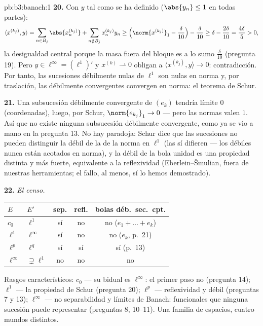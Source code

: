 \begin{solution}{pb:b3:banach:1}
\textbf{20.} Con $y$ tal como se ha definido ($\abs{y_n} \leq 1$ en
todas partes):
\[
\langle x^{(k_j)}, y\rangle
= \sum_{n \in B_j}\abs{x^{(k_j)}_n}
+ \sum_{n \notin B_j}x^{(k_j)}_ny_n
\geq \Bigl(\norm{x^{(k_j)}}_1 - \frac\delta{10}\Bigr) -
\frac\delta{10}
\geq \delta - \frac{2\delta}{10} = \frac{4\delta}5 > 0,
\]
la desigualdad central porque la masa fuera del bloque es a lo sumo
$\frac\delta{10}$ (pregunta 19). Pero $y \in
\ell^\infty = (\ell^1)'$ y $x^{(k)} \rightharpoonup 0$ obligan a
$\langle x^{(k_j)}, y\rangle \to 0$: contradicción. Por tanto, las
sucesiones débilmente nulas de $\ell^1$ son nulas en norma y, por
traslación, las débilmente convergentes convergen en norma: el teorema
de Schur.

\textbf{21.} Una subsucesión débilmente convergente de $(e_k)$ tendría
límite $0$ (coordenadas), luego, por Schur, $\norm{e_{k_j}}_1
\to 0$ --- pero las normas valen $1$. Así que no existe ninguna
subsucesión débilmente convergente, como ya se vio a mano en la pregunta
13. No hay paradoja: Schur dice que las sucesiones no pueden distinguir
la  débil de la de la norma
en $\ell^1$ (las  sí difieren --- los
 débiles nunca están acotados
en norma), y la  débil de la bola unidad es una propiedad distinta y más
fuerte, equivalente a la reflexividad (Eberlein--Šmulian, fuera de
nuestras herramientas; el fallo, al menos, sí lo hemos demostrado).

\textbf{22.} \emph{El censo.}
\begin{center}
\begin{tabular}{l|l|c|c|c}
$E$ & $E'$ & sep. & refl. & bolas déb.\ sec.\ cpt.\\
\hline
$c_0$ & $\ell^1$ & sí & no & no ($e_1{+}\dots{+}e_k$)\\
$\ell^1$ & $\ell^\infty$ & sí & no & no ($e_k$, p.~21)\\
$\ell^p$ & $\ell^q$ & sí & sí & sí (p.~13)\\
$\ell^\infty$ & $\supsetneq\ell^1$ & no & no & no\\
\end{tabular}
\end{center}
Rasgos característicos: $c_0$ --- su bidual es $\ell^\infty$: el primer
paso no  (pregunta 14); $\ell^1$
--- la propiedad de Schur (pregunta 20); $\ell^p$ --- reflexividad y
 débil (preguntas 7 y 13); $\ell^\infty$ --- no separabilidad
y límites de Banach: funcionales que ninguna sucesión puede representar
(preguntas 8, 10--11). Una familia de espacios, cuatro mundos distintos.


\end{solution}
